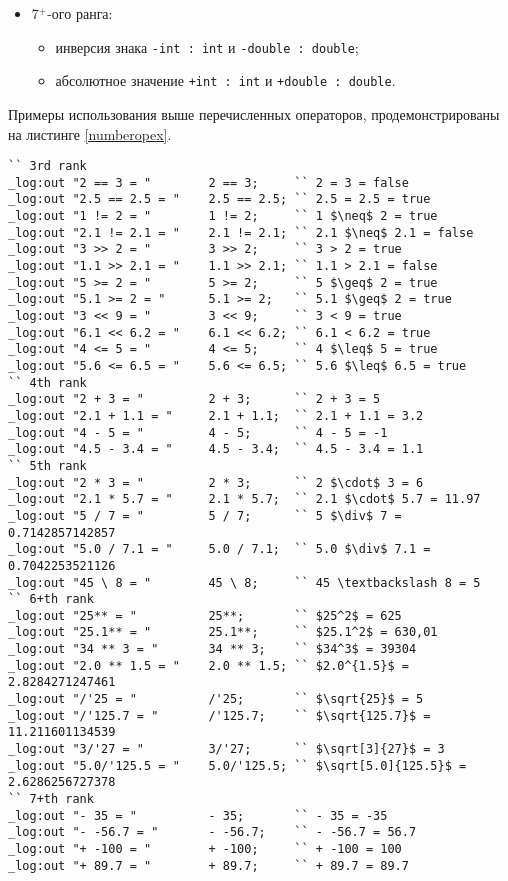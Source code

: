 \documentclass[a4paper, 14pt]{extarticle}
\newenvironment{icItems}
	{ \begin{itemize} [noitemsep,nolistsep] }
	{ \end{itemize} }
\begin{document}
\begin{icItems}
\begin{icItems}
			\item извлечения квадратного корня \lstinline`/'int : int` и \lstinline`/'double : double`;
			\item извлечения корня \lstinline`int/'int : int` и \lstinline`double/'double : double`.
		\end{icItems}
	\item 7$^+$-ого ранга:
		\begin{icItems}
			\item инверсия знака \lstinline`-int : int` и \lstinline`-double : double`;
			\item абсолютное значение \lstinline`+int : int` и \lstinline`+double : double`.
		\end{icItems}
\end{icItems}

	Примеры использования выше перечисленных операторов, продемонстрированы на листинге \ref{numberopex}.
	
\begin{lstlisting}[caption=Примеры использования операторов над данными типа int и double, label=numberopex]
`` 3rd rank
_log:out "2 == 3 = "		2 == 3;		`` 2 = 3 = false
_log:out "2.5 == 2.5 = "	2.5 == 2.5;	`` 2.5 = 2.5 = true
_log:out "1 != 2 = "		1 != 2;		`` 1 $\neq$ 2 = true
_log:out "2.1 != 2.1 = "	2.1 != 2.1;	`` 2.1 $\neq$ 2.1 = false
_log:out "3 >> 2 = "		3 >> 2;		`` 3 > 2 = true
_log:out "1.1 >> 2.1 = "	1.1 >> 2.1;	`` 1.1 > 2.1 = false
_log:out "5 >= 2 = "		5 >= 2;		`` 5 $\geq$ 2 = true
_log:out "5.1 >= 2 = "		5.1 >= 2;	`` 5.1 $\geq$ 2 = true
_log:out "3 << 9 = "		3 << 9;		`` 3 < 9 = true
_log:out "6.1 << 6.2 = "	6.1 << 6.2;	`` 6.1 < 6.2 = true
_log:out "4 <= 5 = "		4 <= 5;		`` 4 $\leq$ 5 = true
_log:out "5.6 <= 6.5 = "	5.6 <= 6.5;	`` 5.6 $\leq$ 6.5 = true
`` 4th rank
_log:out "2 + 3 = "			2 + 3;		`` 2 + 3 = 5
_log:out "2.1 + 1.1 = "		2.1 + 1.1;	`` 2.1 + 1.1 = 3.2
_log:out "4 - 5 = "			4 - 5;		`` 4 - 5 = -1
_log:out "4.5 - 3.4 = "		4.5 - 3.4;	`` 4.5 - 3.4 = 1.1
`` 5th rank
_log:out "2 * 3 = "			2 * 3;		`` 2 $\cdot$ 3 = 6
_log:out "2.1 * 5.7 = "		2.1 * 5.7;	`` 2.1 $\cdot$ 5.7 = 11.97
_log:out "5 / 7 = "			5 / 7;		`` 5 $\div$ 7 = 0.7142857142857
_log:out "5.0 / 7.1 = "		5.0 / 7.1;	`` 5.0 $\div$ 7.1 = 0.7042253521126
_log:out "45 \ 8 = "		45 \ 8;		`` 45 \textbackslash 8 = 5
`` 6+th rank
_log:out "25** = "			25**;		`` $25^2$ = 625
_log:out "25.1** = "		25.1**;		`` $25.1^2$ = 630,01
_log:out "34 ** 3 = "		34 ** 3;	`` $34^3$ = 39304
_log:out "2.0 ** 1.5 = "	2.0 ** 1.5;	`` $2.0^{1.5}$ = 2.8284271247461
_log:out "/'25 = "			/'25;		`` $\sqrt{25}$ = 5
_log:out "/'125.7 = "		/'125.7;	`` $\sqrt{125.7}$ = 11.211601134539
_log:out "3/'27 = "			3/'27;		`` $\sqrt[3]{27}$ = 3
_log:out "5.0/'125.5 = "	5.0/'125.5;	`` $\sqrt[5.0]{125.5}$ = 2.6286256727378
`` 7+th rank
_log:out "- 35 = "			- 35;		`` - 35 = -35
_log:out "- -56.7 = "		- -56.7;	`` - -56.7 = 56.7
_log:out "+ -100 = "		+ -100;		`` + -100 = 100
_log:out "+ 89.7 = "		+ 89.7;		`` + 89.7 = 89.7
\end{lstlisting}
\end{document}
